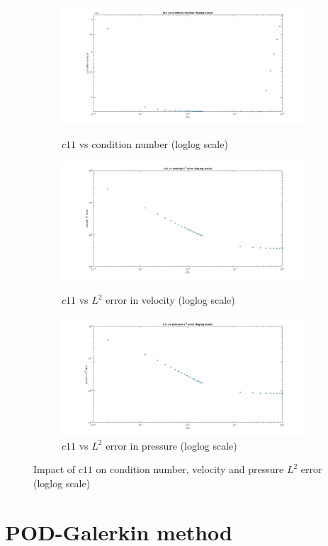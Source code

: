 \documentclass[a4paper,oneside,openright,spanish,english]{book}
\begin{document}
\begin{figure}
\begin{subfigure}{\textwidth}	
  \includegraphics[width=0.8\linewidth]{c11_condition_number_loglog.jpg}
  \caption{$c11$ vs condition number (loglog scale)} 
  \label{$c11$ vs Condition number_loglog}
  \includegraphics[width=0.8\linewidth]{c11_velocity_l2_error_loglog.jpg}
  \caption{$c11$ vs $L^2$ error in velocity (loglog scale)} 
  \label{c11_L2_error_velocity_loglog}
  \includegraphics[width=0.8\linewidth]{c11_pressure_l2_error_loglog.jpg}
  \caption{$c11$ vs $L^2$ error in pressure (loglog scale)} 
  \label{c11_L2_error_pressure_loglog}
\end{subfigure}
\caption{Impact of $c11$ on condition number, velocity and pressure $L^2$ error (loglog scale)}
\label{all_c11_figure_loglog}
\end{figure}

\section{POD-Galerkin method}
\end{document}
